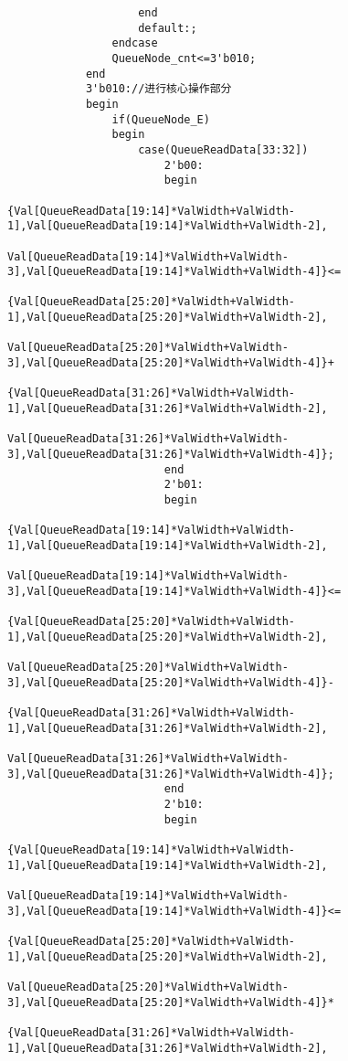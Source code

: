 \documentclass[lang=cn,11pt,a4paper]{elegantpaper}
\begin{document}
\begin{lstlisting}
                    end
                    default:;
                endcase
                QueueNode_cnt<=3'b010;
            end
            3'b010://进行核心操作部分
            begin
                if(QueueNode_E)
                begin
                    case(QueueReadData[33:32])
                        2'b00:
                        begin
                            {Val[QueueReadData[19:14]*ValWidth+ValWidth-1],Val[QueueReadData[19:14]*ValWidth+ValWidth-2],
                            Val[QueueReadData[19:14]*ValWidth+ValWidth-3],Val[QueueReadData[19:14]*ValWidth+ValWidth-4]}<=
                            {Val[QueueReadData[25:20]*ValWidth+ValWidth-1],Val[QueueReadData[25:20]*ValWidth+ValWidth-2],
                            Val[QueueReadData[25:20]*ValWidth+ValWidth-3],Val[QueueReadData[25:20]*ValWidth+ValWidth-4]}+
                            {Val[QueueReadData[31:26]*ValWidth+ValWidth-1],Val[QueueReadData[31:26]*ValWidth+ValWidth-2],
                            Val[QueueReadData[31:26]*ValWidth+ValWidth-3],Val[QueueReadData[31:26]*ValWidth+ValWidth-4]};
                        end
                        2'b01:
                        begin
                            {Val[QueueReadData[19:14]*ValWidth+ValWidth-1],Val[QueueReadData[19:14]*ValWidth+ValWidth-2],
                            Val[QueueReadData[19:14]*ValWidth+ValWidth-3],Val[QueueReadData[19:14]*ValWidth+ValWidth-4]}<=
                            {Val[QueueReadData[25:20]*ValWidth+ValWidth-1],Val[QueueReadData[25:20]*ValWidth+ValWidth-2],
                            Val[QueueReadData[25:20]*ValWidth+ValWidth-3],Val[QueueReadData[25:20]*ValWidth+ValWidth-4]}-
                            {Val[QueueReadData[31:26]*ValWidth+ValWidth-1],Val[QueueReadData[31:26]*ValWidth+ValWidth-2],
                            Val[QueueReadData[31:26]*ValWidth+ValWidth-3],Val[QueueReadData[31:26]*ValWidth+ValWidth-4]};
                        end
                        2'b10:
                        begin
                            {Val[QueueReadData[19:14]*ValWidth+ValWidth-1],Val[QueueReadData[19:14]*ValWidth+ValWidth-2],
                            Val[QueueReadData[19:14]*ValWidth+ValWidth-3],Val[QueueReadData[19:14]*ValWidth+ValWidth-4]}<=
                            {Val[QueueReadData[25:20]*ValWidth+ValWidth-1],Val[QueueReadData[25:20]*ValWidth+ValWidth-2],
                            Val[QueueReadData[25:20]*ValWidth+ValWidth-3],Val[QueueReadData[25:20]*ValWidth+ValWidth-4]}*
                            {Val[QueueReadData[31:26]*ValWidth+ValWidth-1],Val[QueueReadData[31:26]*ValWidth+ValWidth-2],

\end{lstlisting}
\end{document}
